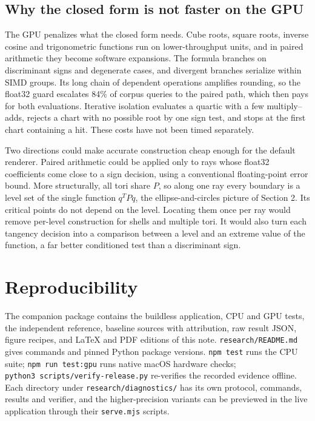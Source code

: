 \documentclass[11pt,a4paper]{article}
\begin{document}
\subsection{Why the closed form is not faster on the
GPU}\label{why-the-closed-form-is-not-faster-on-the-gpu}

The GPU penalizes what the closed form needs. Cube roots, square roots,
inverse cosine and trigonometric functions run on lower-throughput
units, and in paired arithmetic they become software expansions. The
formula branches on discriminant signs and degenerate cases, and
divergent branches serialize within SIMD groups. Its long chain of
dependent operations amplifies rounding, so the float32 guard escalates
84\% of corpus queries to the paired path, which then pays for both
evaluations. Iterative isolation evaluates a quartic with a few
multiply--adds, rejects a chart with no possible root by one sign test,
and stops at the first chart containing a hit. These costs have not been
timed separately.

Two directions could make accurate construction cheap enough for the
default renderer. Paired arithmetic could be applied only to rays whose
float32 coefficients come close to a sign decision, using a conventional
floating-point error bound. More structurally, all tori share \(P\), so
along one ray every boundary is a level set of the single function
\(q^TPq\), the ellipse-and-circles picture of Section 2. Its critical
points do not depend on the level. Locating them once per ray would
remove per-level construction for shells and multiple tori. It would
also turn each tangency decision into a comparison between a level and
an extreme value of the function, a far better conditioned test than a
discriminant sign.

\section{Reproducibility}\label{reproducibility}

The companion package contains the buildless application, CPU and GPU
tests, the independent reference, baseline sources with attribution, raw
result JSON, figure recipes, and LaTeX and PDF editions of this note.
\texttt{research/README.md} gives commands and pinned Python package
versions. \texttt{npm\ test} runs the CPU suite;
\texttt{npm\ run\ test:gpu} runs native macOS hardware checks;
\texttt{python3\ scripts/verify-release.py} re-verifies the recorded
evidence offline. Each directory under \texttt{research/diagnostics/}
has its own protocol, commands, results and verifier, and the
higher-precision variants can be previewed in the live application
through their \texttt{serve.mjs} scripts.
\end{document}
